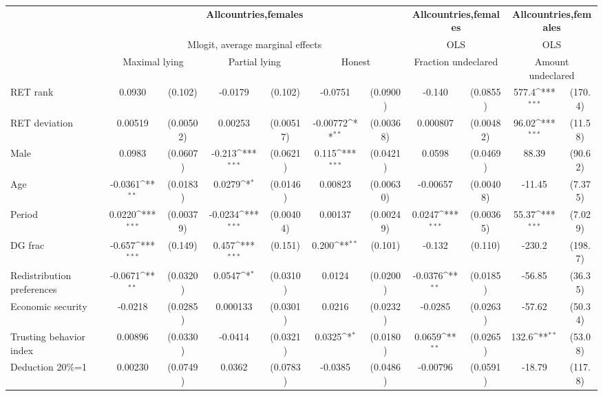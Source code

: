 \def\sym#1{\ifmmode^{#1}\else\(^{#1}\)\fi}
\begin{tabular}{l|cccccc|cc|cc}
\hline\hline
&\multicolumn{6}{c|}{\bf All\space{}countries,\space{}females}&\multicolumn{2}{c|}{\bf All\space{}countries,\space{}females}&\multicolumn{2}{c}{\bf All\space{}countries,\space{}females}\\ &\multicolumn{6}{c|}{Mlogit, average marginal effects }&\multicolumn{2}{c|}{OLS}&\multicolumn{2}{c}{OLS}\\
                &\multicolumn{2}{c}{Maximal lying}&\multicolumn{2}{c}{Partial lying}&\multicolumn{2}{c}{Honest}  &\multicolumn{2}{c}{Fraction undeclared}&\multicolumn{2}{c}{Amount undeclared}\\
\hline
RET rank        &   0.0930         &  (0.102)&  -0.0179         &  (0.102)&  -0.0751         & (0.0900)&   -0.140         & (0.0855)&    577.4\sym{***}&  (170.4)\\
RET deviation   &  0.00519         &(0.00502)&  0.00253         &(0.00517)& -0.00772\sym{**} &(0.00368)& 0.000807         &(0.00482)&    96.02\sym{***}&  (11.58)\\
Male            &   0.0983         & (0.0607)&   -0.213\sym{***}& (0.0621)&    0.115\sym{***}& (0.0421)&   0.0598         & (0.0469)&    88.39         &  (90.62)\\
Age             &  -0.0361\sym{**} & (0.0183)&   0.0279\sym{*}  & (0.0146)&  0.00823         &(0.00630)& -0.00657         &(0.00408)&   -11.45         &  (7.375)\\
Period          &   0.0220\sym{***}&(0.00379)&  -0.0234\sym{***}&(0.00404)&  0.00137         &(0.00249)&   0.0247\sym{***}&(0.00365)&    55.37\sym{***}&  (7.029)\\
DG frac         &   -0.657\sym{***}&  (0.149)&    0.457\sym{***}&  (0.151)&    0.200\sym{**} &  (0.101)&   -0.132         &  (0.110)&   -230.2         &  (198.7)\\
Redistribution preferences&  -0.0671\sym{**} & (0.0320)&   0.0547\sym{*}  & (0.0310)&   0.0124         & (0.0200)&  -0.0376\sym{**} & (0.0185)&   -56.85         &  (36.35)\\
Economic security&  -0.0218         & (0.0285)& 0.000133         & (0.0301)&   0.0216         & (0.0232)&  -0.0285         & (0.0263)&   -57.62         &  (50.34)\\
Trusting behavior index&  0.00896         & (0.0330)&  -0.0414         & (0.0321)&   0.0325\sym{*}  & (0.0180)&   0.0659\sym{**} & (0.0265)&    132.6\sym{**} &  (53.08)\\
Deduction 20\%=1&  0.00230         & (0.0749)&   0.0362         & (0.0783)&  -0.0385         & (0.0486)& -0.00796         & (0.0591)&   -18.79         &  (117.8)\\

\end{tabular}
